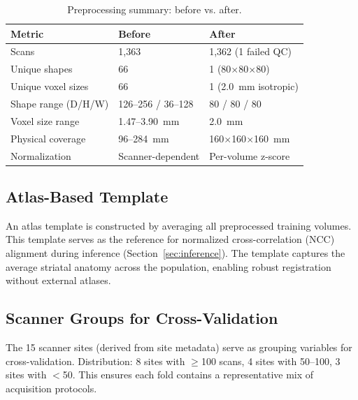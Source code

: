 \begin{table}[htbp]
\centering
\caption{Preprocessing summary: before vs. after.}
\label{tab:preprocessing_summary}
\begin{tabular}{lll}
\toprule
\textbf{Metric} & \textbf{Before} & \textbf{After} \\
\midrule
Scans & 1,363 & 1,362 (1 failed QC) \\
Unique shapes & 66 & 1 (80$\times$80$\times$80) \\
Unique voxel sizes & 66 & 1 (2.0~mm isotropic) \\
Shape range (D/H/W) & 126--256 / 36--128 & 80 / 80 / 80 \\
Voxel size range & 1.47--3.90~mm & 2.0~mm \\
Physical coverage & 96--284~mm & 160$\times$160$\times$160~mm \\
Normalization & Scanner-dependent & Per-volume z-score \\
\bottomrule
\end{tabular}
\end{table}

\subsection{Atlas-Based Template}
\label{sec:atlas}
An atlas template is constructed by averaging all preprocessed training volumes. This template serves as the reference for normalized cross-correlation (NCC) alignment during inference (Section~\ref{sec:inference}). The template captures the average striatal anatomy across the population, enabling robust registration without external atlases.

\subsection{Scanner Groups for Cross-Validation}
\label{sec:groups}
The 15 scanner sites (derived from site metadata) serve as grouping variables for cross-validation. Distribution: 8 sites with $\ge$100 scans, 4 sites with 50--100, 3 sites with $<$50. This ensures each fold contains a representative mix of acquisition protocols.